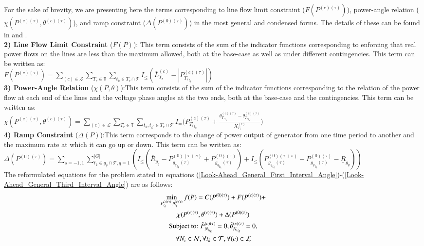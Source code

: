 \documentclass[preprint,12pt,3p]{elsarticle}
\begin{document}
For the sake of brevity, we are presenting here the terms corresponding to line flow limit constraint ($F(P^{(c)(\tau)})$), power-angle relation ($\chi(P^{(c)(\tau)},\theta^{(c)(\tau)})$), and ramp constraint ($\Delta(P^{(0)(\tau)})$) in the most general and condensed forms. The details of these can be found in \cite{CK:14} and \cite{Sambuddha2017}.\\
\textbf{2) Line Flow Limit Constraint} ($F(P)$): This term consists of the sum of the indicator functions corresponding to enforcing that real power flows on the lines are less than the maximum allowed, both at the base-case as well as under different contingencies. This term can be written as:\\
$F(P^{(c)(\tau)})=\sum_{(c)\in\mathcal{L}}\sum_{T_r\in \mathbb{T}}\sum_{t_k\in T_r\cap{\mathcal{T}}}I_{\leq}({\overline{L}}_{T_r}^{(c)}-|{P}_{{T_r}_{t_k}}^{(c)(\tau)}|)$\\
\textbf{3) Power-Angle Relation} ($\chi(P,\theta)$):This term consists of the sum of the indicator functions corresponding to the relation of the power flow at each end of the lines and the voltage phase angles at the two ends, both at the base-case and the contingencies. This term can be written as:\\
$\chi(P^{(c)(\tau)},\theta^{(c)(\tau)})=\sum_{(c)\in\mathcal{L}}\sum_{T_r\in \mathbb{T}}\sum_{t_k,t_{k^{'}}\in T_r\cap{\mathcal{T}}}I_{=}\Bigg({P}_{{T_r}_{t_k}}^{(c)(\tau)}+\frac{{\theta}_{{T_r}_{t_k}}^{(c)(\tau)}-{\theta}_{{T_r}_{t_{k^{'}}}}^{(c)(\tau)}}{{X}_{T_r}^{(c)}}\Bigg)$\\
\textbf{4) Ramp Constraint} ($\Delta(P)$):This term corresponds to the change of power output of generator from one time period to another and the maximum rate at which it can go up or down. This term can be written as:\\
$\Delta(P^{(0)(\tau)})=\sum_{s=-1,1}\sum_{t_k\in g_q\cap{\mathcal{T}}, q=1}^{|G|}(I_{\leq}(\overline{R}_{g_q}-P_{{g_q}_{t_k}(\tau)}^{(0)(\tau+s)}+P_{{g_q}_{t_k}(\tau)}^{(0)(\tau)})+I_{\leq}(P_{{g_q}_{t_k}(\tau)}^{(0)(\tau+s)}-P_{{g_q}_{t_k}(\tau)}^{(0)(\tau)}-\underline{R}_{g_q}))$\\
The reformulated equations for the problem stated in equations (\ref{Look-Ahead_General_First_Interval_Angle})-(\ref{Look-Ahead_General_Third_Interval_Angle}) are as follows:
\begin{subequations}\label{DTN_for_Contingency_General_Looakahead_Demand}
\begin{gather}
\min_{P_{t_k}^{(c)(\tau)}, \theta_{t_k}^{(c)(\tau)}}f(P)=C(P^{(0)(\tau)})
+F(P^{(c)(\tau)})+\notag\\\chi(P^{(c)(\tau)},\theta^{(c)(\tau)})
+\Delta(P^{(0)(\tau)})\label{DTN_for_Contingency_General_Looakahead_Demand1}\\
\text{Subject to: }\hat{P}_{{N_i}_{t_k}}^{(c)(\tau)}=0, \tilde{\theta}_{{N_i}_{t_k}}^{(c)(\tau)}=0,\notag\\\forall N_i\in\mathcal{N}, \forall t_k\in\mathcal{T}, \forall (c)\in\mathcal{L}\label{DTN_for_Contingency_General_Looakahead_Demand2}
\end{gather}
\end{subequations}
\end{document}
